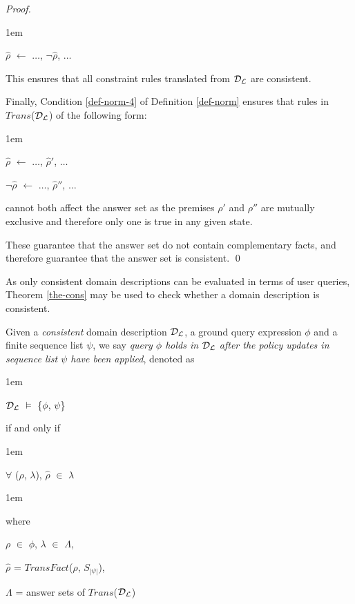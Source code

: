 \documentclass[global,twocolumn,final]{svjour}
\newenvironment{vdefinition}
  {\begin{definition}\hspace{0.25em}}
  {\end{definition}}
\newenvironment{vproof}
  {\begin{proof}\hspace{0.25em}}
  {\qed\end{proof}}
\newenvironment{vquote}
  {\begin{list}{}{\leftmargin 1em}\item[]}
  {\end{list}}
\begin{document}
\begin{vproof}
      \begin{vquote}
        $\hat{\rho}$ $\leftarrow$ $\hdots$, $\lnot\hat{\rho}$, $\hdots$
      \end{vquote}

      \noindent
      This ensures that all constraint rules translated from
      ${\cal D}_{\cal L}$ are consistent.

      Finally, Condition \ref{def-norm-4} of Definition \ref{def-norm}
      ensures that rules in $Trans$(${\cal D}_{\cal L}$) of the following form:

      \begin{vquote}
        $\hat{\rho}$ $\leftarrow$ $\hdots$, $\hat{\rho}'$, $\hdots$

        $\lnot \hat{\rho}$ $\leftarrow$ $\hdots$, $\hat{\rho}''$, $\hdots$
      \end{vquote}

      \noindent
      cannot both affect the answer set as the premises $\rho'$ and $\rho''$
      are mutually exclusive and therefore only one is true in any given state.

      These guarantee that the answer set do not contain complementary facts,
      and therefore guarantee that the answer set is consistent.
    \end{vproof}

    As only consistent domain descriptions can be evaluated in terms of user
    queries, Theorem \ref{the-cons} may be used to check whether a domain
    description is consistent.

    \begin{vdefinition}
      \label{def-eval}
      Given a {\em consistent} domain description ${\cal D}_{\cal L}$, a ground
      query expression $\phi$ and a finite sequence list $\psi$, we say
      {\em query $\phi$ holds in ${\cal D}_{\cal L}$ after the policy updates
      in sequence list $\psi$ have been applied}, denoted as

      \begin{vquote}
        ${\cal D}_{\cal L}$ $\models$ \{$\phi$, $\psi$\}
      \end{vquote}

      \noindent
      if and only if

      \begin{vquote}
        $\forall$ ($\rho$, $\lambda$),
        $\hat{\rho}$ $\in$ $\lambda$

      \end{vquote}

      \begin{vquote}
        where

        $\rho$ $\in$ $\phi$,
        $\lambda$ $\in$ $\Lambda$,

        $\hat{\rho}$ = $TransFact$($\rho$, $S_{|\psi|}$),

        $\Lambda$ = answer sets of $Trans$(${\cal D}_{\cal L}$)
      \end{vquote}
    \end{vdefinition}
\end{document}
